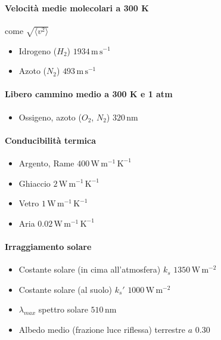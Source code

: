 \documentclass[10pt, oneside]{book}
\begin{document}
\paragraph{Velocità medie molecolari a 300 K} come $\displaystyle \sqrt{\langle v^2 \rangle}$
\begin{itemize}
\item Idrogeno ($H_2$) \dotfill $ 1934 \, \mathrm{m \, s^{-1}}$ 
\item Azoto ($N_2$) \dotfill $ 493 \, \mathrm{m \, s^{-1}}$ 
\end{itemize}
\paragraph{Libero cammino medio a 300 K e 1 atm}
\begin{itemize}
\item Ossigeno, azoto ($O_2$, $N_2$) \dotfill $ 320 \, \mathrm{nm}$ 
\end{itemize}
\paragraph{Conducibilità termica}
\begin{itemize}
\item Argento, Rame \dotfill $ 400 \, \mathrm{W \, m^{-1} \, K^{-1}}$ 

\item Ghiaccio \dotfill $ 2 \, \mathrm{W \, m^{-1} \, K^{-1}}$ 

\item Vetro \dotfill $ 1 \, \mathrm{W \, m^{-1} \, K^{-1}}$ 

\item Aria \dotfill $ 0.02 \, \mathrm{W \, m^{-1} \, K^{-1}}$ 
\end{itemize}

\paragraph{Irraggiamento solare}
\begin{itemize}
\item Costante solare (in cima all'atmosfera) $k_s$ \dotfill $ 1350 \, \mathrm{W \, m^{-2}}$ 
\item Costante solare (al suolo) $k_s'$ \dotfill $ 1000 \, \mathrm{W \, m^{-2}}$ 
\item $\lambda_{max}$ spettro solare \dotfill $ 510 \, \mathrm{nm}$ 
\item Albedo medio (frazione luce riflessa) terrestre $a$ \dotfill $ 0.30$ 
\end{itemize}
\end{document}
